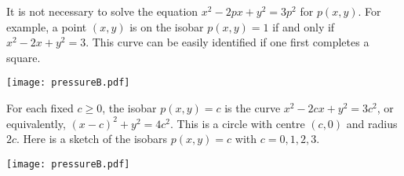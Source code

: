 \begin{hint}
It is not necessary to solve the equation $x^2-2px+y^2=3p^2$ for $p(x,y)$.
For example, a point $(x,y)$ is on the isobar $p(x,y)=1$ if and only if
$x^2-2x+y^2=3$. This curve can be easily identified if one first completes a 
square.
\end{hint}


\begin{answer}
\begin{center}
     \texttt{[image: pressureB.pdf]}
\end{center}

\end{answer}


\begin{solution}
For each fixed $c\ge 0$, the isobar $p(x,y)=c$ is the curve
$x^2-2cx+y^2=3c^2$, or equivalently, $(x-c)^2+y^2=4c^2$. This is a 
circle with centre $(c,0)$ and radius $2c$. Here is a sketch of the isobars
$p(x,y)=c$ with $c=0,1,2,3$.

\begin{center}
     \texttt{[image: pressureB.pdf]}
\end{center}


\end{solution}
